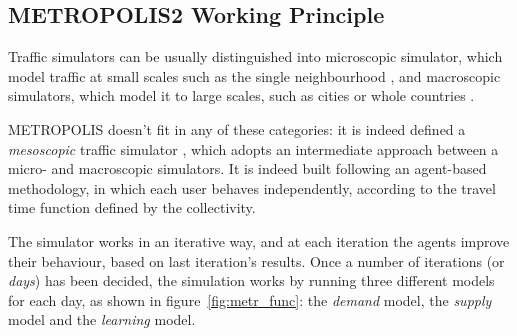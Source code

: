 \subsection{METROPOLIS2 Working Principle}
\label{sec:metr}

Traffic simulators can be usually distinguished into microscopic simulator,
which model traffic at small scales such as the single neighbourhood \parencite{8569938},
and macroscopic simulators, which model it to large scales,
such as cities or whole countries \parencite{mcnally2007four}.

METROPOLIS doesn't fit in any of these categories:
it is indeed defined a \textit{mesoscopic} traffic simulator \parencite{RePEc:ema:worpap:2024-03},
which adopts an intermediate approach between a micro- and macroscopic simulators.
It is indeed built following an agent-based methodology,
in which each user behaves independently,
according to the travel time function defined by the collectivity.

The simulator works in an iterative way,
and at each iteration the agents improve their behaviour,
based on last iteration's results.
Once a number of iterations (or \textit{days}) has been decided,
the simulation works by running three different models for each day, as shown in figure~\ref{fig:metr_func}:
the \textit{demand} model, the \textit{supply} model and the \textit{learning} model.

